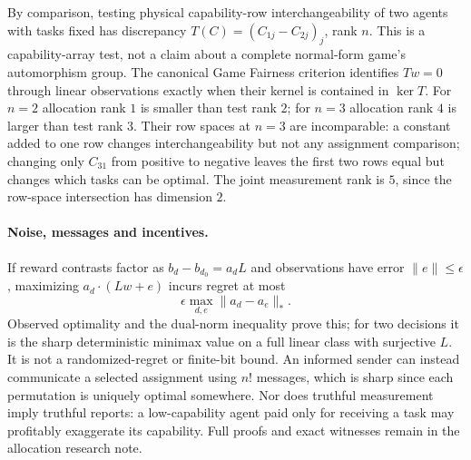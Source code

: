 By comparison, testing physical capability-row interchangeability of two agents
with tasks fixed has discrepancy $T(C)=(C_{1j}-C_{2j})_j$, rank $n$.
This is a capability-array test, not a claim about a complete normal-form game's
automorphism group. The canonical Game Fairness criterion identifies $Tw=0$
through linear observations exactly when their kernel is contained in $\ker T$.
For $n=2$ allocation rank $1$ is smaller than test rank $2$; for $n=3$
allocation rank $4$ is larger than test rank $3$. Their row spaces at $n=3$
are incomparable: a constant added to one row changes interchangeability but
not any assignment comparison; changing only $C_{31}$ from positive to
negative leaves the first two rows equal but changes which tasks can be
optimal. The joint measurement rank is $5$, since the row-space intersection
has dimension $2$.

\paragraph{Noise, messages and incentives.}
If reward contrasts factor as $b_d-b_{d_0}=a_dL$ and observations have error
$\|e\|\le\epsilon$, maximizing $a_d\cdot(Lw+e)$ incurs regret at most
\[
 \epsilon\max_{d,e}\|a_d-a_e\|_*.
\]
Observed optimality and the dual-norm inequality prove this; for two decisions
it is the sharp deterministic minimax value on a full linear class with
surjective $L$. It is not a randomized-regret or finite-bit bound. An informed
sender can instead communicate a selected assignment using $n!$ messages,
which is sharp since each permutation is uniquely optimal somewhere. Nor does
truthful measurement imply truthful reports: a low-capability agent paid only
for receiving a task may profitably exaggerate its capability. Full proofs
and exact witnesses remain in the allocation research note.
